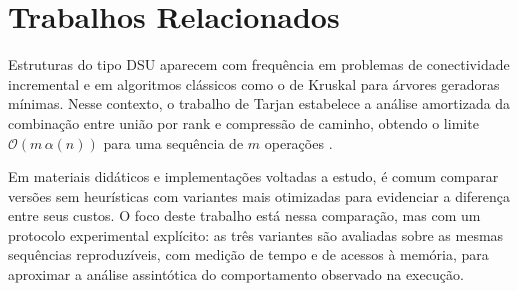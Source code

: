 \section{Trabalhos Relacionados}
\label{sec:relacionados}

Estruturas do tipo DSU aparecem com frequência em problemas de conectividade incremental e em algoritmos clássicos como o de Kruskal para árvores geradoras mínimas. Nesse contexto, o trabalho de Tarjan estabelece a análise amortizada da combinação entre união por rank e compressão de caminho, obtendo o limite $\mathcal{O}(m\,\alpha(n))$ para uma sequência de $m$ operações \cite{tarjan1975efficiency}.

Em materiais didáticos e implementações voltadas a estudo, é comum comparar versões sem heurísticas com variantes mais otimizadas para evidenciar a diferença entre seus custos. O foco deste trabalho está nessa comparação, mas com um protocolo experimental explícito: as três variantes são avaliadas sobre as mesmas sequências reproduzíveis, com medição de tempo e de acessos à memória, para aproximar a análise assintótica do comportamento observado na execução.
